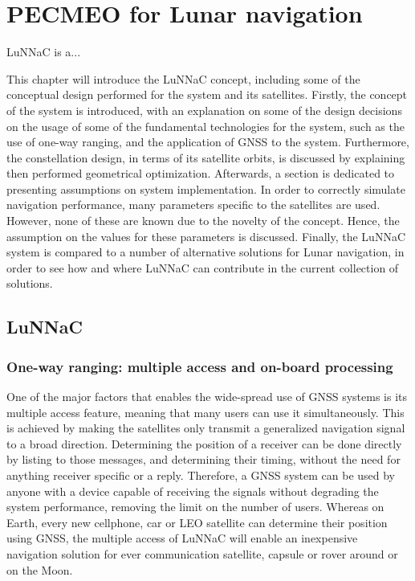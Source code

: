 \chapter{PECMEO for Lunar navigation}

LuNNaC is a...

This chapter will introduce the LuNNaC concept, including some of the conceptual design performed for the system and its satellites.
Firstly, the concept of the system is introduced, with an explanation on some of the design decisions on the usage of some of the fundamental technologies for the system, such as the use of one-way ranging, and the application of GNSS to the system.
Furthermore, the constellation design, in terms of its satellite orbits, is discussed by explaining then performed geometrical optimization.
Afterwards, a section is dedicated to presenting assumptions on system implementation. In order to correctly simulate navigation performance, many parameters specific to the satellites are used. However, none of these are known due to the novelty of the concept. Hence, the assumption on the values for these parameters is discussed.
Finally, the LuNNaC system is compared to a number of alternative solutions for Lunar navigation, in order to see how and where LuNNaC can contribute in the current collection of solutions.

\section{LuNNaC}
\subsection{One-way ranging: multiple access and on-board processing}
\label{sec:gnss_oneway}
One of the major factors that enables the wide-spread use of GNSS systems is its multiple access feature, meaning that many users can use it simultaneously.
This is achieved by making the satellites only transmit a generalized navigation signal to a broad direction.
Determining the position of a receiver can be done directly by listing to those messages, and determining their timing, without the need for anything receiver specific or a reply.
Therefore, a GNSS system can be used by anyone with a device capable of receiving the signals without degrading the system performance, removing the limit on the number of users.
Whereas on Earth, every new cellphone, car or LEO satellite can determine their position using GNSS, the multiple access of LuNNaC will enable an inexpensive navigation solution for ever communication satellite, capsule or rover around or on the Moon.

